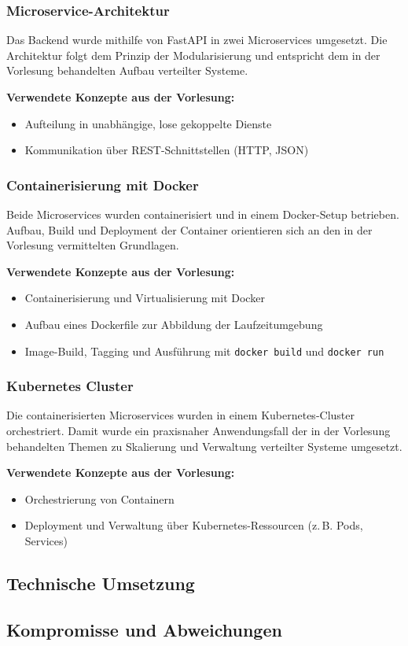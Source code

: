 \subsubsection*{Microservice-Architektur}

Das Backend wurde mithilfe von FastAPI in zwei Microservices umgesetzt. Die Architektur folgt dem Prinzip der Modularisierung und entspricht dem in der Vorlesung behandelten Aufbau verteilter Systeme.

\textbf{Verwendete Konzepte aus der Vorlesung:}
\begin{itemize}
  \item Aufteilung in unabhängige, lose gekoppelte Dienste
  \item Kommunikation über REST-Schnittstellen (HTTP, JSON)
\end{itemize}

\subsubsection*{Containerisierung mit Docker}

Beide Microservices wurden containerisiert und in einem Docker-Setup betrieben. Aufbau, Build und Deployment der Container orientieren sich an den in der Vorlesung vermittelten Grundlagen.

\textbf{Verwendete Konzepte aus der Vorlesung:}
\begin{itemize}
  \item Containerisierung und Virtualisierung mit Docker
  \item Aufbau eines Dockerfile zur Abbildung der Laufzeitumgebung
  \item Image-Build, Tagging und Ausführung mit \texttt{docker build} und \texttt{docker run}
\end{itemize}

\subsubsection*{Kubernetes Cluster}

Die containerisierten Microservices wurden in einem Kubernetes-Cluster orchestriert. Damit wurde ein praxisnaher Anwendungsfall der in der Vorlesung behandelten Themen zu Skalierung und Verwaltung verteilter Systeme umgesetzt.

\textbf{Verwendete Konzepte aus der Vorlesung:}
\begin{itemize}
  \item Orchestrierung von Containern
  \item Deployment und Verwaltung über Kubernetes-Ressourcen (z.\,B. Pods, Services)
\end{itemize}


\subsection{Technische Umsetzung}

\subsection{Kompromisse und Abweichungen}
